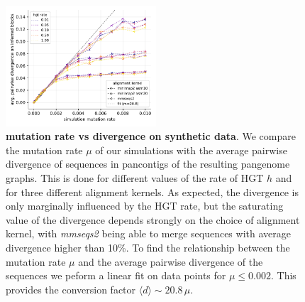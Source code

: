 \documentclass[aps,rmp,reprint,superscriptaddress,notitlepage,10pt,onecolumn]{revtex4-1}
\newcommand{\avg}[1]{\langle #1 \rangle}
\begin{document}
\begin{figure}[htb]
    \includegraphics[width=0.5\textwidth]{figs_suppl/snps_rate_vs_divergence.pdf}
    \caption{{\bf mutation rate vs divergence on synthetic data}. We compare the mutation rate $\mu$ of our simulations with the average pairwise divergence of sequences in pancontigs of the resulting pangenome graphs. This is done for different values of the rate of HGT $h$ and for three different alignment kernels. As expected, the divergence is only marginally influenced by the HGT rate, but the saturating value of the divergence depends strongly on the choice of alignment kernel, with \textit{mmseqs2} being able to merge sequences with average divergence higher than 10\%. To find the relationship between the mutation rate $\mu$ and the average pairwise divergence of the sequences we peform a linear fit on data points for $\mu \leq 0.002$. This provides the conversion factor $\avg{d} \sim 20.8 \, \mu$.}
    \label{fig:snps-suppl}
\end{figure}
\end{document}

